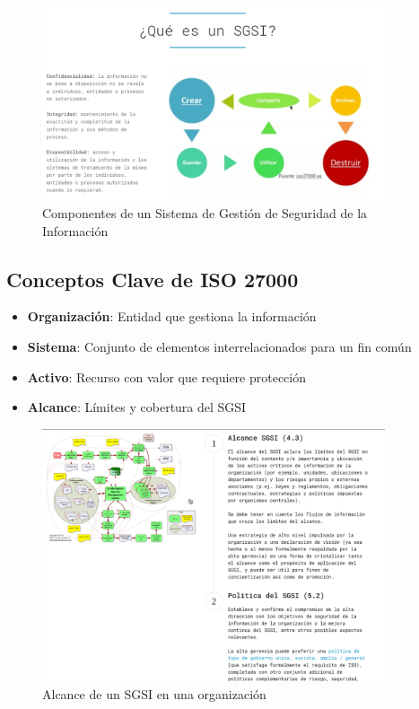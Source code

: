 \documentclass[12pt,a4paper]{article}
\begin{document}
\begin{figure}[H]
    \centering
    \includegraphics[width=0.9\textwidth]{sgsi.png}
    \caption{Componentes de un Sistema de Gestión de Seguridad de la Información}
    \label{fig:sgsi}
\end{figure}

\subsection{Conceptos Clave de ISO 27000}
\begin{itemize}
    \item \textbf{Organización}: Entidad que gestiona la información
    \item \textbf{Sistema}: Conjunto de elementos interrelacionados para un fin común
    \item \textbf{Activo}: Recurso con valor que requiere protección
    \item \textbf{Alcance}: Límites y cobertura del SGSI
\end{itemize}

\begin{figure}[H]
    \centering
    \includegraphics[width=0.9\textwidth]{alcance_sgsi.png}
    \caption{Alcance de un SGSI en una organización}
    \label{fig:alcance_sgsi}
\end{figure}
\end{document}
